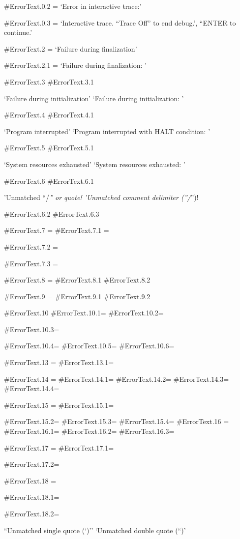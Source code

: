 \#ErrorText.0.2 = `Error in interactive trace:'

\#ErrorText.0.3 = `Interactive trace. ``Trace Off'' to end debug.',
``ENTER to continue.'

\#ErrorText.2 = `Failure during finalization'

\#ErrorText.2.1 = `Failure during finalization: '

\#ErrorText.3 \#ErrorText.3.1

`Failure during initialization' `Failure during initialization: '

\#ErrorText.4 \#ErrorText.4.1

`Program interrupted' `Program interrupted with HALT condition: '

\#ErrorText.5 \#ErrorText.5.1

`System resources exhausted' `System resources exhausted: '

\#ErrorText.6 \#ErrorText.6.1

'Unmatched ``/\emph{'' or quote! 'Unmatched comment delimiter (''/}'')!

\#ErrorText.6.2 \#ErrorText.6.3

\#ErrorText.7 = \#ErrorText.7.1 =

\#ErrorText.7.2 =

\#ErrorText.7.3 =

\#ErrorText.8 = \#ErrorText.8.1 \#ErrorText.8.2

\#ErrorText.9 = \#ErrorText.9.1 \#ErrorText.9.2

\#ErrorText.10 \#ErrorText.10.1= \#ErrorText.10.2=

\#ErrorText.10.3=

\#ErrorText.10.4= \#ErrorText.10.5= \#ErrorText.10.6=

\#ErrorText.13 = \#ErrorText.13.1=

\#ErrorText.14 = \#ErrorText.14.1= \#ErrorText.14.2= \#ErrorText.14.3=
\#ErrorText.14.4=

\#ErrorText.15 = \#ErrorText.15.1=

\#ErrorText.15.2= \#ErrorText.15.3= \#ErrorText.15.4= \#ErrorText.16 =
\#ErrorText.16.1= \#ErrorText.16.2= \#ErrorText.16.3=

\#ErrorText.17 = \#ErrorText.17.1=

\#ErrorText.17.2=

\#ErrorText.18 =

\#ErrorText.18.1=

\#ErrorText.18.2=

``Unmatched single quote (`)'' `Unmatched double quote (``)'

